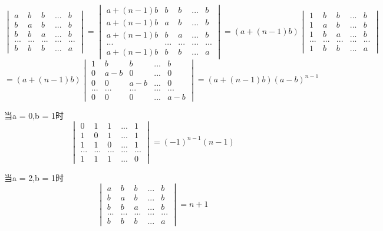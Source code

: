 \[\begin{vmatrix}
a & b & b & ... & b \\
b & a & b & ... & b \\ 
b & b & a & ... & b \\ 
... & ... & ... & ... & ... \\ 
b & b & b & ... & a
\end{vmatrix} = 
\begin{vmatrix}
a + (n-1)b & b & b & ... & b \\
a + (n-1)b & a & b & ... & b \\ 
a + (n-1)b & b & a & ... & b \\ 
... & ... & ... & ... & ... \\ 
a + (n-1)b & b & b & ... & a
\end{vmatrix} = (a+(n-1)b)
\begin{vmatrix}
1 & b & b & ... & b \\
1 & a & b & ... & b \\ 
1 & b & a & ... & b \\ 
... & ... & ... & ... & ... \\ 
1 & b & b & ... & a
\end{vmatrix}\]
\[= (a+(n-1)b)
\begin{vmatrix}
1 & b & b & ... & b \\
0 & a-b & 0 & ... & 0 \\ 
0 & 0 & a-b & ... & 0 \\ 
... & ... & ... & ... & ... \\ 
0 & 0 & 0 & ... & a-b
\end{vmatrix} = (a+(n-1)b)(a-b)^{n-1}\]

当a = 0,b = 1时
\[\begin{vmatrix}
0 & 1 & 1 & ... & 1 \\
1 & 0 & 1 & ... & 1 \\ 
1 & 1 & 0 & ... & 1 \\ 
... & ... & ... & ... & ... \\ 
1 & 1 & 1 & ... & 0
\end{vmatrix} = (-1)^{n-1}(n - 1)\]

当a = 2,b = 1时
\[\begin{vmatrix}
a & b & b & ... & b \\
b & a & b & ... & b \\ 
b & b & a & ... & b \\ 
... & ... & ... & ... & ... \\ 
b & b & b & ... & a
\end{vmatrix} = n + 1\]

